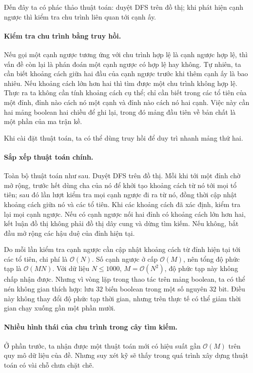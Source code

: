 \documentclass[11pt]{article}
\newcommand{\Oh}{\mathcal{O}}
\begin{document}
Đến đây ta có phác thảo thuật toán: duyệt DFS trên đồ thị; khi phát hiện cạnh
ngược thì kiểm tra chu trình liên quan tới cạnh ấy.

\paragraph{Kiểm tra chu trình bằng truy hồi.}
Nếu gọi một cạnh ngược tương ứng với chu trình hợp lệ là cạnh ngược hợp lệ,
thì vấn đề còn lại là phán đoán một cạnh ngược có hợp lệ hay không. Tự nhiên,
ta cần biết khoảng cách giữa hai đầu của cạnh ngược trước khi thêm cạnh ấy là
bao nhiêu. Nếu khoảng cách lớn hơn hai thì tìm được một chu trình không hợp
lệ. Thực ra ta không cần tính khoảng cách cụ thể; chỉ cần biết trong các tổ
tiên của một đỉnh, đỉnh nào cách nó một cạnh và đỉnh nào cách nó hai cạnh.
Việc này cần hai mảng boolean hai chiều để ghi lại, trong đó mảng đầu tiên về
bản chất là một phần của ma trận kề.

Khi cài đặt thuật toán, ta có thể dùng truy hồi để duy trì nhanh mảng thứ hai.

\paragraph{Sắp xếp thuật toán chính.}
Toàn bộ thuật toán như sau. Duyệt DFS trên đồ thị. Mỗi khi tới một đỉnh chờ
mở rộng, trước hết dùng cha của nó để khởi tạo khoảng cách từ nó tới mọi tổ
tiên; sau đó lần lượt kiểm tra mọi cạnh ngược đi ra từ nó, đồng thời cập nhật
khoảng cách giữa nó và các tổ tiên. Khi các khoảng cách đã xác định, kiểm tra
lại mọi cạnh ngược. Nếu có cạnh ngược nối hai đỉnh có khoảng cách lớn hơn hai,
kết luận đồ thị không phải đồ thị dây cung và dừng tìm kiếm. Nếu không, bắt
đầu mở rộng các hậu duệ của đỉnh hiện tại.

Do mỗi lần kiểm tra cạnh ngược cần cập nhật khoảng cách từ đỉnh hiện tại tới
các tổ tiên, chi phí là \(\Oh(N)\). Số cạnh ngược ở cấp \(\Oh(M)\), nên tổng
độ phức tạp là \(\Oh(MN)\). Với dữ liệu \(N\le 1000\), \(M=\Oh(N^2)\), độ
phức tạp này không chấp nhận được. Nhưng vì vòng lặp trong thao tác trên mảng
boolean, ta có thể nén không gian thích hợp: lưu \(32\) biến boolean trong
một số nguyên \(32\) bit. Điều này không thay đổi độ phức tạp thời gian, nhưng
trên thực tế có thể giảm thời gian chạy xuống gần một phần mười.

\paragraph{Nhiều hình thái của chu trình trong cây tìm kiếm.}
Ở phần trước, ta nhận được một thuật toán mới có hiệu suất gần \(\Oh(M)\) trên
quy mô dữ liệu của đề. Nhưng suy xét kỹ sẽ thấy trong quá trình xây dựng thuật
toán có vài chỗ chưa chặt chẽ.
\end{document}
